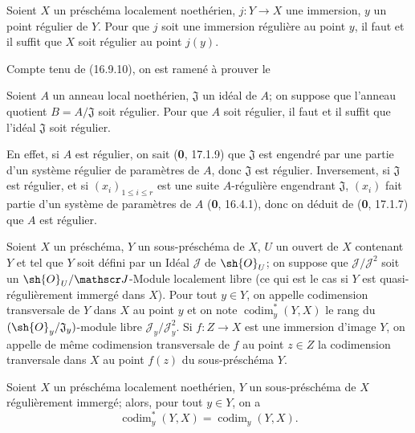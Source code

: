 \begin{proposition}[19.1.1]
\label{IV.19.1.1}
Soient $X$ un préschéma localement noethérien, $j:Y\to X$ une immersion, $y$ un point régulier de $Y$. Pour que $j$ soit une immersion régulière au point $y$, il faut et il suffit que $X$ soit régulier au point $j(y)$.
\end{proposition}

Compte tenu de (16.9.10), on est ramené à prouver le

\begin{corollary}[19.1.2]
Soient $A$ un anneau local noethérien, $\mathfrak J$ un idéal de $A$; on suppose que l'anneau quotient $B=A/\mathfrak J$ soit régulier. Pour que $A$ soit régulier, il faut et il suffit que l'idéal $\mathfrak J$ soit régulier.
\end{corollary}

En effet, si $A$ est régulier, on sait (\textbf{0}, 17.1.9) que $\mathfrak J$ est engendré par une partie d'un système régulier de paramètres de $A$, donc $\mathfrak J$ est régulier. Inversement, si $\mathfrak J$ est régulier, et si $(x_i)_{1\leq i\leq r}$ est une suite $A$-régulière engendrant $\mathfrak J$, $(x_i)$ fait partie d'un système de paramètres de $A$ (\textbf{0}, 16.4.1), donc on déduit de (\textbf{0}, 17.1.7) que $A$ est régulier.

\begin{definition}[19.1.3]
Soient $X$ un préschéma, $Y$ un sous-préschéma de $X$, $U$ un ouvert de $X$ contenant $Y$ et tel que $Y$ soit défini par un Idéal $\mathscr J$ de $\sh{O}_U$; on suppose que $\mathscr J/\mathscr J^2$ soit un $\sh{O}_U/\mathscr J$-Module localement libre \textup{(ce qui est le cas si $Y$ est quasi-régulièrement immergé dans $X$)}. Pour tout $y\in Y$, on appelle codimension transversale de $Y$ dans $X$ au point $y$ et on note $\operatorname{codim}_y^*(Y,X)$ le rang du $(\sh{O}_y/\mathfrak J_y)$-module libre $\mathscr J_y/\mathscr J_y^2$. Si $f:Z\to X$ est une immersion d'image $Y$, on appelle de même codimension transversale de $f$ au point $z\in Z$ la codimension tranversale dans $X$ au point $f(z)$ du sous-préschéma $Y$.
\end{definition}

\begin{proposition}[19.1.4]
\label{IV.19.1.4}
Soient $X$ un préschéma localement noethérien, $Y$ un sous-préschéma de $X$ régulièrement immergé; alors, pour tout $y\in Y$, on a
\begin{equation}
  \operatorname{codim}_y^*(Y,X)=\operatorname{codim}_y(Y,X).
  \tag{19.1.4.1}\label{IV.19.1.4.1}
\end{equation}
\end{proposition}

